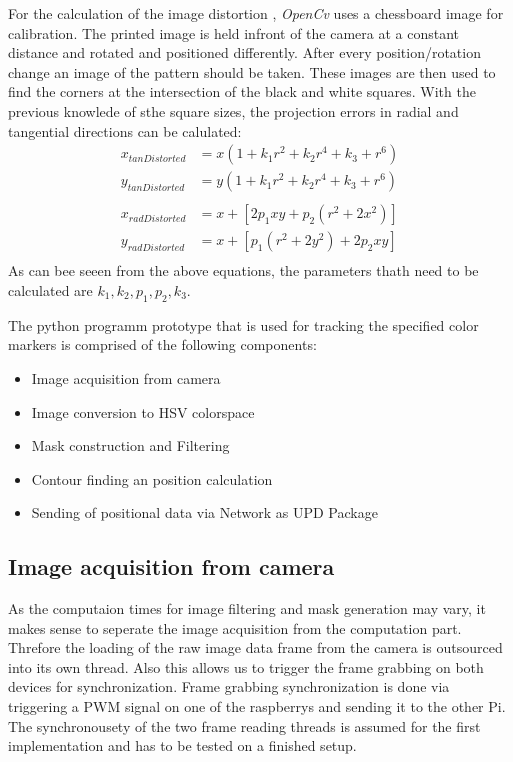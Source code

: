 For the calculation of the image distortion , \textit{OpenCv} uses a chessboard image for calibration. The printed image is held infront of the camera at a constant distance and rotated and positioned differently. After every position/rotation change an image of the pattern should be taken.
These images are then used to find the corners at the intersection of the black and white squares. With the previous knowlede of sthe square sizes, the projection errors in radial and tangential directions can be calulated:
\begin{equation}
\begin{split}
x_{tanDistorted}&=x(1+k_{1}r^{2}+k_{2}r^{4}+k_{3}+r^{6})\\
y_{tanDistorted}&=y(1+k_{1}r^{2}+k_{2}r^{4}+k_{3}+r^{6})\\
\\
x_{radDistorted}&=x+[2p_{1}xy+p_{2}(r^{2}+2x^{2})]\\
y_{radDistorted}&=x+[p_{1}(r^{2}+2y^{2})+2p_{2}xy]\\
\end{split}
\end{equation} 
As can bee seeen from the above equations, the parameters thath need to be calculated are $k_{1},k_{2},p_{1},p_{2},k_{3}$.

The python programm prototype that is used for tracking the specified color markers is comprised of the following components:
\begin{itemize}
\item Image acquisition from camera
\item Image conversion to HSV colorspace
\item Mask construction and Filtering
\item Contour finding an position calculation
\item Sending of positional data via Network as UPD Package
\end{itemize}

\subsection{Image acquisition from camera}
As the computaion times for image filtering and mask generation may vary, it makes sense to seperate the image acquisition from the computation part. Threfore the loading of the raw image data frame from the camera is outsourced into its own thread. Also this allows us to trigger the frame grabbing on both devices for synchronization. Frame grabbing synchronization is done via triggering a PWM signal on one of the raspberrys and sending it to the other Pi.
The synchronousety of the two frame reading threads is assumed for the first implementation and has to be tested on a finished setup.\\

